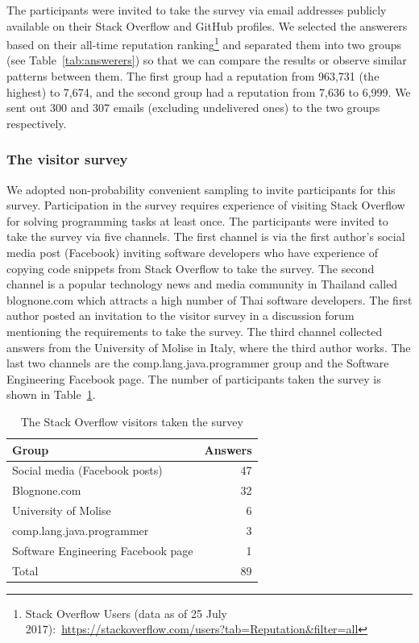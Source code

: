 \documentclass{svjour3}                     %
\begin{document}
The participants were invited to take the survey via email addresses publicly
available on their Stack Overflow and GitHub profiles. We selected the answerers
based on their all-time reputation ranking\footnote{Stack Overflow Users (data as of
	25 July 2017):~\url{https://stackoverflow.com/users?tab=Reputation&filter=all}}
and separated them into two groups (see Table~\ref{tab:answerers}) so that we
can compare the results or observe similar patterns between them. The first
group had a reputation from 963,731 (the highest) to 7,674, and the second group
had a reputation from 7,636 to 6,999. We sent out 300 and 307 emails
(excluding undelivered ones) to the two groups respectively. 

\subsubsection{The visitor survey} 
We adopted non-probability convenient sampling to invite participants for this
survey. Participation in the survey requires experience of visiting Stack
Overflow for solving programming tasks at least once. The participants were
invited to take the survey via five channels. The first channel is via the first
author's social media post (Facebook) inviting software developers who have
experience of copying code snippets from Stack Overflow to take the survey. The
second channel is a popular technology news and media community in Thailand
called \textsf{blognone.com} which attracts a high number of Thai software
developers. The first author posted an invitation to the visitor survey in a
discussion forum mentioning the requirements to take the survey. The third
channel collected answers from the University of Molise in Italy, where the third author
works. The last two channels are the
\textsf{comp.lang.java.programmer} group and the Software Engineering
Facebook page. The number of participants taken the survey is shown in
Table~\ref{tab:visitors}.

\begin{table}
	\centering
	\caption{The Stack Overflow visitors taken the survey}
	\label{tab:visitors}
	\begin{tabular}{lr}
		\toprule
		Group & Answers \\
		\midrule
		Social media (Facebook posts) & 47 \\
		Blognone.com & 32 \\
		University of Molise & 6 \\
		comp.lang.java.programmer & 3 \\
		Software Engineering Facebook page & 1 \\
		\midrule
		Total & 89 \\
		\bottomrule
	\end{tabular}
\end{table}
\end{document}
